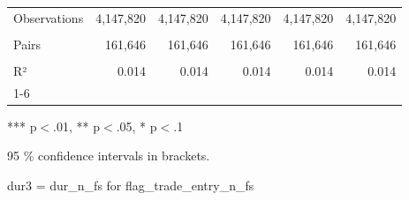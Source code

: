 \begin{table}[!h]
\begin{tabular}{llllll}
\multicolumn{1}{l}{Observations} &
  \multicolumn{1}{|r}{4,147,820} &
  \multicolumn{1}{r}{4,147,820} &
  \multicolumn{1}{r}{4,147,820} &
  \multicolumn{1}{r}{4,147,820} &
  \multicolumn{1}{r}{4,147,820} \\
\multicolumn{1}{l}{} &
  \multicolumn{1}{|r}{} &
  \multicolumn{1}{r}{} &
  \multicolumn{1}{r}{} &
  \multicolumn{1}{r}{} &
  \multicolumn{1}{r}{} \\
\multicolumn{1}{l}{Pairs} &
  \multicolumn{1}{|r}{161,646} &
  \multicolumn{1}{r}{161,646} &
  \multicolumn{1}{r}{161,646} &
  \multicolumn{1}{r}{161,646} &
  \multicolumn{1}{r}{161,646} \\
\multicolumn{1}{l}{} &
  \multicolumn{1}{|r}{} &
  \multicolumn{1}{r}{} &
  \multicolumn{1}{r}{} &
  \multicolumn{1}{r}{} &
  \multicolumn{1}{r}{} \\
\multicolumn{1}{l}{R²} &
  \multicolumn{1}{|r}{0.014} &
  \multicolumn{1}{r}{0.014} &
  \multicolumn{1}{r}{0.014} &
  \multicolumn{1}{r}{0.014} &
  \multicolumn{1}{r}{0.014} \\
\cline{1-6}
\end{tabular}

\footnotesize{
*** p$<$.01, ** p$<$.05, * p$<$.1

95 \% confidence intervals in brackets.

dur3 = dur\_n\_fs for flag\_trade\_entry\_n\_fs
}
\end{table}
